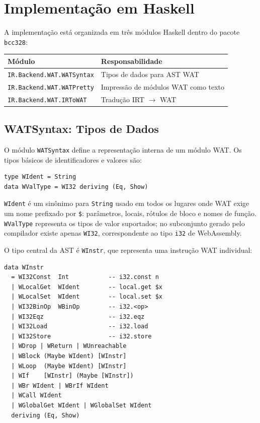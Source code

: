 \section{Implementação em Haskell}\label{sec:wat-haskell}

A implementação está organizada em três módulos Haskell dentro do pacote
\texttt{bcc328}:

\begin{center}
  \begin{tabular}{ll}
    \hline
    \textbf{Módulo} & \textbf{Responsabilidade} \\
    \hline
    \texttt{IR.Backend.WAT.WATSyntax} & Tipos de dados para AST WAT \\
    \texttt{IR.Backend.WAT.WATPretty} & Impressão de módulos WAT como texto \\
    \texttt{IR.Backend.WAT.IRToWAT}   & Tradução IRT $\to$ WAT \\
    \hline
  \end{tabular}
\end{center}

\subsection{WATSyntax: Tipos de Dados}

O módulo \texttt{WATSyntax} define a representação interna de um módulo WAT.
Os tipos básicos de identificadores e valores são:

\begin{verbatim}
type WIdent = String
data WValType = WI32 deriving (Eq, Show)
\end{verbatim}

\texttt{WIdent} é um sinônimo para \texttt{String} usado em todos os lugares
onde WAT exige um nome prefixado por \texttt{\$}: parâmetros, locais,
rótulos de bloco e nomes de função.  \texttt{WValType} representa os tipos de
valor suportados; no subconjunto gerado pelo compilador existe apenas
\texttt{WI32}, correspondente ao tipo \texttt{i32} de WebAssembly.

O tipo central da AST é \texttt{WInstr}, que representa uma instrução WAT
individual:

\begin{verbatim}
data WInstr
  = WI32Const  Int           -- i32.const n
  | WLocalGet  WIdent        -- local.get $x
  | WLocalSet  WIdent        -- local.set $x
  | WI32BinOp  WBinOp        -- i32.<op>
  | WI32Eqz                  -- i32.eqz
  | WI32Load                 -- i32.load
  | WI32Store                -- i32.store
  | WDrop | WReturn | WUnreachable
  | WBlock (Maybe WIdent) [WInstr]
  | WLoop  (Maybe WIdent) [WInstr]
  | WIf    [WInstr] (Maybe [WInstr])
  | WBr WIdent | WBrIf WIdent
  | WCall WIdent
  | WGlobalGet WIdent | WGlobalSet WIdent
  deriving (Eq, Show)
\end{verbatim}

